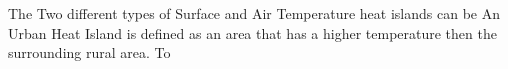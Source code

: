 
The Two different types of Surface and Air Temperature heat islands can be  
An Urban Heat Island is defined as an area that has a higher temperature then the surrounding rural area\cite{EPA_Uhi}. 
To
